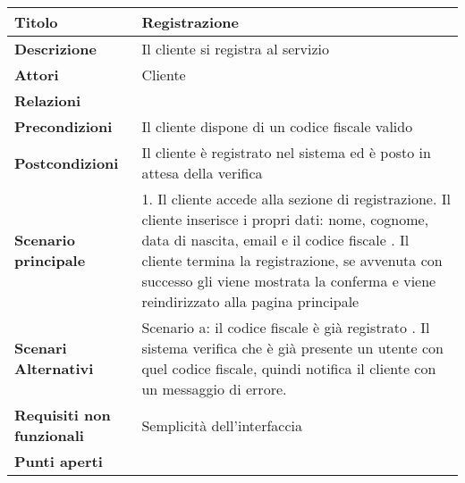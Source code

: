 \begin{tabular} {|P{4.5cm}|P{12.5cm}|}
\hline
    \textbf{Titolo} & Registrazione\\
\hline
  \textbf{Descrizione} & Il cliente si registra al servizio\\
\hline
  \textbf{Attori} & Cliente\\
\hline
  \textbf{Relazioni} &\\
\hline
\textbf{Precondizioni} & Il cliente dispone di un codice fiscale valido\\
\hline
  \textbf{Postcondizioni} & Il cliente è registrato nel sistema ed è posto in attesa della verifica\\
\hline
  \textbf{Scenario principale} & 1. Il cliente accede alla sezione di registrazione. Il cliente inserisce i propri dati: nome, cognome, data di nascita, email e il codice fiscale . Il cliente termina la registrazione, se avvenuta con successo gli viene mostrata la conferma e viene reindirizzato alla pagina principale\\
\hline
  \textbf{Scenari Alternativi} & Scenario a: il codice fiscale è già registrato . Il sistema verifica che è già presente un utente con quel codice fiscale, quindi notifica il cliente con un messaggio di errore.\\
\hline
  \textbf{Requisiti non funzionali} & Semplicità dell'interfaccia\\
\hline
  \textbf{Punti aperti} &\\
\hline
\end{tabular}
\hfill
\break


